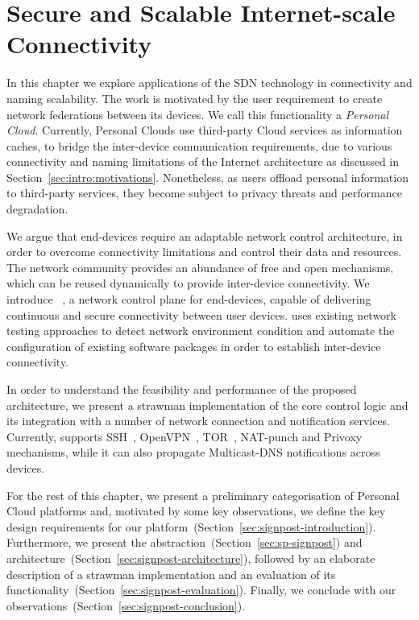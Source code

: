 \chapter{Secure and Scalable Internet-scale Connectivity}\label{sec:signpost}

In this chapter we explore applications of the SDN technology in connectivity
and naming scalability.  The work is motivated by the user requirement to
create network federations between its devices.  We call this functionality a
\emph{Personal Cloud}.  Currently, Personal Clouds use third-party Cloud
services as information caches, to bridge the inter-device communication
requirements, due to various connectivity and naming limitations of the
Internet architecture as discussed in Section~\ref{sec:intro:motivations}.
Nonetheless, as users offload personal information to third-party services,
they become subject to privacy threats and performance degradation.

We argue that end-devices require an adaptable network control architecture, in
order to overcome  connectivity limitations and control their data and
resources.  The network community provides an abundance of free and open
mechanisms, which can be reused dynamically to provide inter-device
connectivity.  We introduce \signpost~, a network control
plane for end-devices, capable of delivering continuous and secure connectivity
between user devices. \signpost uses existing network testing approaches to
detect network environment condition and automate the configuration of existing
software packages in order to establish inter-device connectivity. 

In order to understand the feasibility and performance of the proposed
architecture, we present a strawman implementation of the core control logic and
its integration with a number of network connection and notification services.
Currently, \signpost supports SSH~, OpenVPN~,
TOR~, NAT-punch and Privoxy~ 
mechanisms, while it can also propagate Multicast-DNS notifications across
devices.

For the rest of this chapter, we present a preliminary categorisation of
Personal Cloud platforms and, motivated by some key observations, we define the
key design requirements for our
platform~(Section~\ref{sec:signpost-introduction}). Furthermore, we present the
\signpost abstraction~(Section~\ref{sec:sp-signpost}) and
architecture~(Section~\ref{sec:signpost-architecture}), followed by an elaborate
description of a strawman \signpost implementation and an evaluation of its
functionality~(Section~\ref{sec:signpost-evaluation}).  Finally, we conclude with our
observations~(Section~\ref{sec:signpost-conclusion}).

